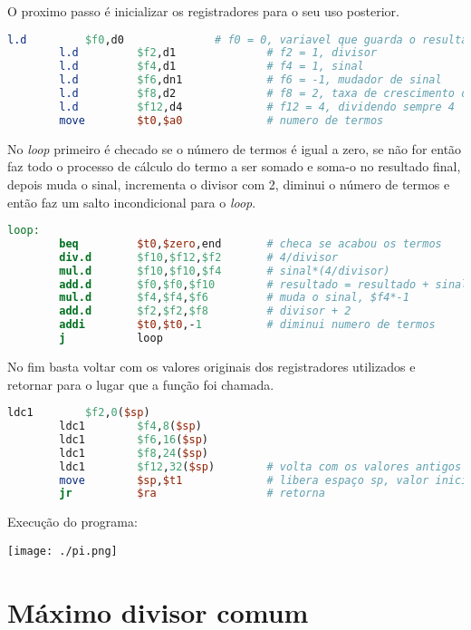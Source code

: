 \documentclass[12pt]{article}
\begin{document}
O proximo passo é inicializar os registradores para o seu uso posterior.

\begin{lstlisting}[language = mips]
        l.d         $f0,d0              # f0 = 0, variavel que guarda o resultado
        l.d         $f2,d1              # f2 = 1, divisor
        l.d         $f4,d1              # f4 = 1, sinal
        l.d         $f6,dn1             # f6 = -1, mudador de sinal
        l.d         $f8,d2              # f8 = 2, taxa de crescimento divisor
        l.d         $f12,d4             # f12 = 4, dividendo sempre 4
        move        $t0,$a0             # numero de termos
\end{lstlisting}

No \emph{loop} primeiro é checado se o número de termos é igual a zero, se não for então faz todo o processo de cálculo do termo a ser somado e soma-o no resultado final, depois muda o sinal, incrementa o divisor com 2, diminui o número de termos e então faz um salto incondicional para o \emph{loop}.

\begin{lstlisting}[language = mips]
loop:
        beq         $t0,$zero,end       # checa se acabou os termos
        div.d       $f10,$f12,$f2       # 4/divisor
        mul.d       $f10,$f10,$f4       # sinal*(4/divisor)
        add.d       $f0,$f0,$f10        # resultado = resultado + sinal*(4/divisor)
        mul.d       $f4,$f4,$f6         # muda o sinal, $f4*-1
        add.d       $f2,$f2,$f8         # divisor + 2
        addi        $t0,$t0,-1          # diminui numero de termos
        j           loop
\end{lstlisting}

No fim basta voltar com os valores originais dos registradores utilizados e retornar para o lugar que a função foi chamada.

\begin{lstlisting}[language = mips]
        ldc1        $f2,0($sp)
        ldc1        $f4,8($sp)
        ldc1        $f6,16($sp)
        ldc1        $f8,24($sp)
        ldc1        $f12,32($sp)        # volta com os valores antigos
        move        $sp,$t1             # libera espaço sp, valor inicial
        jr          $ra                 # retorna
\end{lstlisting}

Execução do programa:
\begin{center}
\texttt{[image: ./pi.png]}
\end{center}
\section{Máximo divisor comum}
\label{sec:org75272d3}
\end{document}
